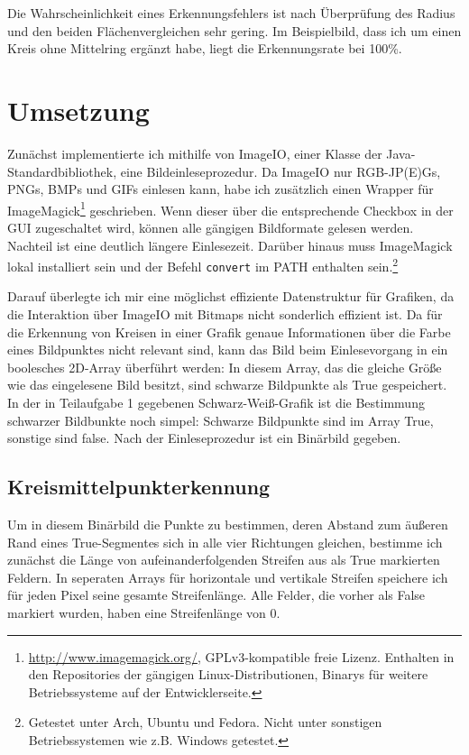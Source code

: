 Die Wahrscheinlichkeit eines Erkennungsfehlers ist nach Überprüfung des Radius und den beiden Flächenvergleichen sehr gering. Im Beispielbild, dass ich um einen Kreis ohne Mittelring ergänzt habe, liegt die Erkennungsrate bei 100\%.

\section{Umsetzung}
Zunächst implementierte ich mithilfe von ImageIO, einer Klasse der Java-Standardbibliothek, eine Bildeinleseprozedur. Da ImageIO nur RGB-JP(E)Gs, PNGs, BMPs und GIFs einlesen kann, habe ich zusätzlich einen Wrapper für ImageMagick\footnote{\url{http://www.imagemagick.org/}, GPLv3-kompatible freie Lizenz. Enthalten in den Repositories der gängigen Linux-Distributionen, Binarys für weitere Betriebssysteme auf der Entwicklerseite.} geschrieben. 
Wenn dieser über die entsprechende Checkbox in der GUI zugeschaltet wird, können alle gängigen Bildformate gelesen werden. 
Nachteil ist eine deutlich längere Einlesezeit. Darüber hinaus muss ImageMagick lokal installiert sein und der Befehl \texttt{convert} im PATH enthalten sein.\footnote{Getestet unter Arch, Ubuntu und Fedora. Nicht unter sonstigen Betriebssystemen wie z.B. Windows getestet.} 

Darauf überlegte ich mir eine möglichst effiziente Datenstruktur für Grafiken, da die Interaktion über ImageIO mit Bitmaps nicht sonderlich effizient ist. Da für die Erkennung von Kreisen in einer Grafik genaue Informationen über die Farbe eines Bildpunktes nicht relevant sind, kann das Bild beim Einlesevorgang in ein boolesches 2D-Array überführt werden: In diesem Array, das die gleiche Größe wie das eingelesene Bild besitzt, sind schwarze Bildpunkte als True gespeichert. In der in Teilaufgabe 1 gegebenen Schwarz-Weiß-Grafik ist die Bestimmung schwarzer Bildbunkte noch simpel: Schwarze Bildpunkte sind im Array True, sonstige sind false.
Nach der Einleseprozedur ist ein Binärbild gegeben.

\subsection{Kreismittelpunkterkennung}
Um in diesem Binärbild die Punkte zu bestimmen, deren Abstand zum äußeren Rand eines True-Segmentes sich in alle vier Richtungen gleichen, bestimme ich zunächst die Länge von aufeinanderfolgenden Streifen aus als True markierten Feldern. In seperaten Arrays für horizontale und vertikale Streifen speichere ich für jeden Pixel seine gesamte Streifenlänge.
Alle Felder, die vorher als False markiert wurden, haben eine Streifenlänge von 0. 

